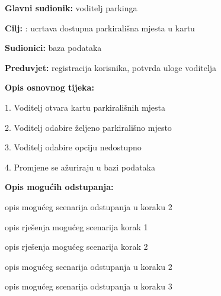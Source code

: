 					\noindent {}
					\begin{packed_item}
						
						\item \textbf{Glavni sudionik: }voditelj parkinga
						\item  \textbf{Cilj:} : ucrtava dostupna parkirališna mjesta u kartu
						\item  \textbf{Sudionici:} baza podataka
						\item  \textbf{Preduvjet:} registracija korisnika, potvrda uloge voditelja
						\item  \textbf{Opis osnovnog tijeka:}
						
						\item[] \begin{packed_enum}
							
							\item 1. Voditelj otvara kartu parkirališnih mjesta
							\item 2. Voditelj odabire željeno parkirališno mjesto
							\item 3. Voditelj odabire opciju nedostupno
							\item 4. Promjene se ažuriraju u bazi podataka
						\end{packed_enum}
						
						\item  \textbf{Opis mogućih odstupanja:}
						
						\item[] \begin{packed_item}
							
							\item[2.a] opis mogućeg scenarija odstupanja u koraku 2
							\item[] \begin{packed_enum}
								
								\item opis rješenja mogućeg scenarija korak 1
								\item opis rješenja mogućeg scenarija korak 2
								
							\end{packed_enum}
							\item[2.b] opis mogućeg scenarija odstupanja u koraku 2
							\item[3.a] opis mogućeg scenarija odstupanja  u koraku 3
							
						\end{packed_item}
					\end{packed_item}
					
